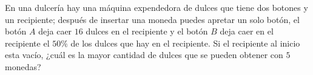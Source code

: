 En una dulcería hay una máquina expendedora de dulces que tiene dos botones y un recipiente; después de insertar una moneda puedes apretar un solo botón, el botón $A$ deja caer $16$ dulces en el recipiente y el botón $B$ deja caer en el recipiente el $50\%$ de los dulces que hay en el recipiente. Si el recipiente al inicio esta vacío, ¿cuál es la mayor cantidad de dulces que se pueden obtener con $5$ monedas?